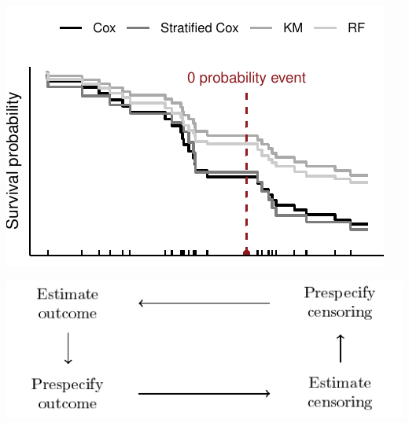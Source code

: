 \documentclass[a0,portrait]{a0poster}
\newcommand*\diff{\mathop{}\!\mathrm{d}}
\newcommand{\R}{\mathbb{R}}
\newcommand{\1}{\mathds{1}}
\begin{document}
\begin{minipage}{\textwidth}
\begin{minipage}[t]{1\linewidth}
\begin{multicols}{2}
\begin{minipage}[t]{0.5\linewidth}
  \includegraphics[width=.9\linewidth]{sl-hold-out-sample.pdf}
\vspace{-11.3cm}
  \label{fig:hold-out}
\end{minipage}
\begin{minipage}[t]{.5\linewidth}
  \begin{center}
    \vspace{-8cm}
    \includegraphics[width=1\linewidth]{ipcw-circle.pdf}
    \vspace{-10.3cm}
        \label{fig:ipcw-circl}
\end{center}
\end{minipage}


\vfill\null\columnbreak






\end{multicols}
\end{minipage}
\end{minipage}
\end{document}
